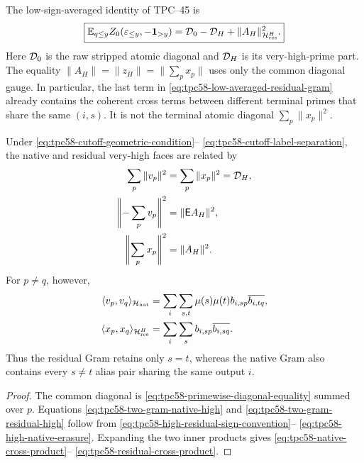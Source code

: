 The low-sign-averaged identity of TPC--45 is
\begin{equation}
 \boxed{
 \mathbb E_{q\le y}Z_0(\varepsilon_{\le y},-\mathbf 1_{>y})
 =\mathcal D_0-\mathcal D_H+\|A_H\|_{\mathcal H_{\rm res}^{H}}^2.}
 \label{eq:tpc58-low-averaged-residual-gram}
\end{equation}
Here \(\mathcal D_0\) is the raw stripped atomic diagonal and \(\mathcal D_H\) is its
very-high-prime part.  The equality
\(\|A_H\|=\|z_H\|=\|\sum_px_p\|\) uses only the common diagonal gauge.
In particular, the last term in
\eqref{eq:tpc58-low-averaged-residual-gram} already contains the coherent
cross terms between different terminal primes that share the same
\((i,s)\).  It is not the terminal atomic diagonal
\(\sum_p\|x_p\|^2\).

\begin{proposition}
\label{prop:tpc58-two-gram-dictionary}
Under \eqref{eq:tpc58-cutoff-geometric-condition}--
\eqref{eq:tpc58-cutoff-label-separation}, the native and residual
very-high faces are related by
\begin{align}
 \sum_p\|v_p\|^2
 &=\sum_p\|x_p\|^2=\mathcal D_H,
 \label{eq:tpc58-two-gram-common-diagonal}\\
 \left\|-\sum_pv_p\right\|^2
 &=\|\mathsf E A_H\|^2,
 \label{eq:tpc58-two-gram-native-high}\\
 \left\|\sum_px_p\right\|^2
 &=\|A_H\|^2.
 \label{eq:tpc58-two-gram-residual-high}
\end{align}
For \(p\ne q\), however,
\begin{align}
 \langle v_p,v_q\rangle_{\mathcal H_{\rm nat}}
 &=\sum_i\sum_{s,t}
   \mu(s)\mu(t)b_{i,sp}\overline{b_{i,tq}},
 \label{eq:tpc58-native-cross-product}\\
 \langle x_p,x_q\rangle_{\mathcal H_{\rm res}^{H}}
 &=\sum_i\sum_s b_{i,sp}\overline{b_{i,sq}}.
 \label{eq:tpc58-residual-cross-product}
\end{align}
Thus the residual Gram retains only \(s=t\), whereas the native Gram also
contains every \(s\ne t\) alias pair sharing the same output \(i\).
\end{proposition}

\begin{proof}
The common diagonal is
\eqref{eq:tpc58-primewise-diagonal-equality} summed over \(p\).
Equations \eqref{eq:tpc58-two-gram-native-high} and
\eqref{eq:tpc58-two-gram-residual-high} follow from
\eqref{eq:tpc58-high-residual-sign-convention}--
\eqref{eq:tpc58-high-native-erasure}.  Expanding the two inner products
gives \eqref{eq:tpc58-native-cross-product}--
\eqref{eq:tpc58-residual-cross-product}.
\end{proof}

